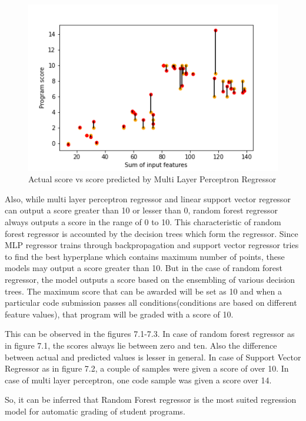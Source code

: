 \begin{figure}[H]
\centering
\includegraphics[scale=1.0]{./figures/ss_mlp.png}
\caption{Actual score vs score predicted by Multi Layer Perceptron Regressor}
\label{fig_rf}
\end{figure}

Also, while multi layer perceptron regressor and linear support vector regressor can output a score greater than 10 or lesser than 0, random forest regressor always outputs a score in the range of 0 to 10. This characteristic of random forest regressor is accounted by the decision trees which form the regressor. Since MLP regressor trains through backpropagation and support vector regressor tries to find the best hyperplane which contains maximum number of points, these models may output a score greater than 10. But in the case of random forest regressor, the model outputs a score based on the ensembling of various decision trees. The maximum score that can be awarded will be set as 10 and when a particular code submission passes all conditions(conditions are based on different feature values), that program will be graded with a score of 10. 

This can be observed in the figures 7.1-7.3. In case of random forest regressor as in figure 7.1, the scores always lie between zero and ten. Also the difference between actual and predicted values is lesser in general. In case of Support Vector Regressor as in figure 7.2, a couple of samples were given a score of over 10. In case of multi layer perceptron, one code sample was given a score over 14.

So, it can be inferred that Random Forest regressor is the most suited regression model for automatic grading of student programs.


